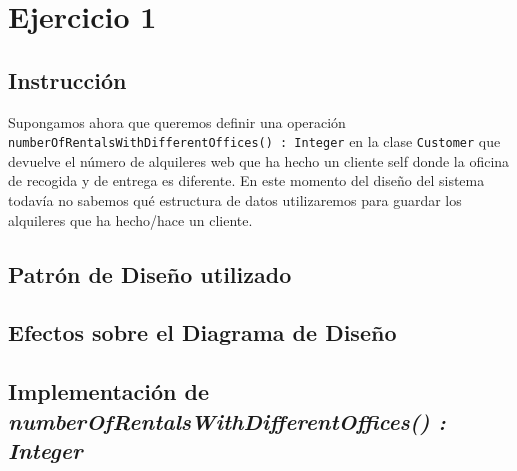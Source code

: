 \section{Ejercicio 1}
\subsection*{Instrucción}
Supongamos ahora que queremos definir una operación \texttt{numberOfRentalsWithDifferentOffices() : Integer} en la clase
\texttt{Customer} que devuelve el número de alquileres web que ha hecho un cliente self donde la oficina de recogida y de
entrega es diferente. En este momento del diseño del sistema todavía no sabemos qué estructura de datos
utilizaremos para guardar los alquileres que ha hecho/hace un cliente.

\subsection{Patrón de Diseño utilizado}


\subsection{Efectos sobre el Diagrama de Diseño}

\subsection{Implementación de \textit{numberOfRentalsWithDifferentOffices() : Integer}}

\newpage
